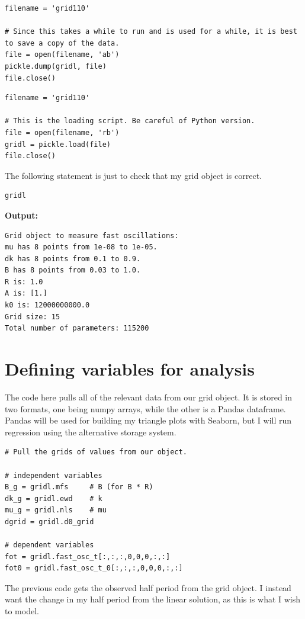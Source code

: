 \documentclass{article}
\begin{document}
\begin{lstlisting}
filename = 'grid110'

# Since this takes a while to run and is used for a while, it is best to save a copy of the data.
file = open(filename, 'ab')
pickle.dump(gridl, file)
file.close()\end{lstlisting}

\begin{lstlisting}
filename = 'grid110'

# This is the loading script. Be careful of Python version.
file = open(filename, 'rb')    
gridl = pickle.load(file)
file.close()\end{lstlisting}

The following statement is just to check that my grid object is correct.

\begin{lstlisting}
gridl\end{lstlisting}

\textbf{Output:}\begin{verbatim}
Grid object to measure fast oscillations:
mu has 8 points from 1e-08 to 1e-05.
dk has 8 points from 0.1 to 0.9.
B has 8 points from 0.03 to 1.0.
R is: 1.0
A is: [1.]
k0 is: 12000000000.0
Grid size: 15
Total number of parameters: 115200
\end{verbatim}

\section{Defining variables for analysis}

The code here pulls all of the relevant data from our grid object. It is stored in two formats, one being numpy arrays, while the other is a Pandas dataframe. Pandas will be used for building my triangle plots with Seaborn, but I will run regression using the alternative storage system.

\begin{lstlisting}
# Pull the grids of values from our object.

# independent variables
B_g = gridl.mfs     # B (for B * R)
dk_g = gridl.ewd    # k
mu_g = gridl.nls    # mu
dgrid = gridl.d0_grid

# dependent variables
fot = gridl.fast_osc_t[:,:,:,0,0,0,:,:]
fot0 = gridl.fast_osc_t_0[:,:,:,0,0,0,:,:]\end{lstlisting}

The previous code gets the observed half period from the grid object. I instead want the change in my half period from the linear solution, as this is what I wish to model.
\end{document}
